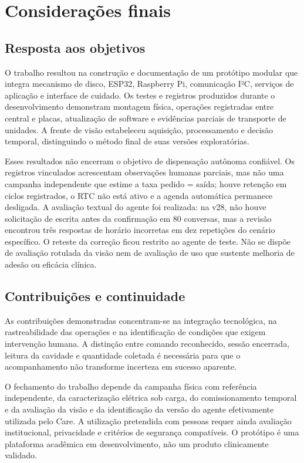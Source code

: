 \chapter{Considerações finais}\label{cap:conclusao}
\section{Resposta aos objetivos}
O trabalho resultou na construção e documentação de um protótipo modular que integra mecanismo de disco, ESP32, Raspberry Pi, comunicação I²C, serviços de aplicação e interface de cuidado. Os testes e registros produzidos durante o desenvolvimento demonstram montagem física, operações registradas entre central e placas, atualização de software e evidências parciais de transporte de unidades. A frente de visão estabeleceu aquisição, processamento e decisão temporal, distinguindo o método final de suas versões exploratórias. 

Esses resultados não encerram o objetivo de dispensação autônoma confiável. Os registros vinculados acrescentam observações humanas parciais, mas não uma campanha independente que estime a taxa pedido = saída; houve retenção em ciclos registrados, o RTC não está ativo e a agenda automática permanece desligada. A avaliação textual do agente foi realizada: na v28, não houve solicitação de escrita antes da confirmação em 80 conversas, mas a revisão encontrou três respostas de horário incorretas em dez repetições do cenário específico. O reteste da correção ficou restrito ao agente de teste. Não se dispõe de avaliação rotulada da visão nem de avaliação de uso que sustente melhoria de adesão ou eficácia clínica. 

\section{Contribuições e continuidade}
As contribuições demonstradas concentram-se na integração tecnológica, na rastreabilidade das operações e na identificação de condições que exigem intervenção humana. A distinção entre comando reconhecido, sessão encerrada, leitura da cavidade e quantidade coletada é necessária para que o acompanhamento não transforme incerteza em sucesso aparente.

O fechamento do trabalho depende da campanha física com referência independente, da caracterização elétrica sob carga, do comissionamento temporal e da avaliação da visão e da identificação da versão do agente efetivamente utilizada pelo Care. A utilização pretendida com pessoas requer ainda avaliação institucional, privacidade e critérios de segurança compatíveis. O protótipo é uma plataforma acadêmica em desenvolvimento, não um produto clinicamente validado.


